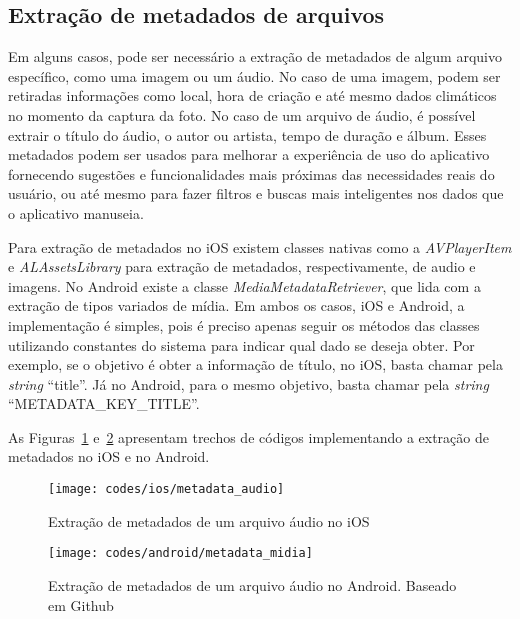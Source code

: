 \subsection{Extração de metadados de arquivos} \label{subsec:extracaometadata}
Em alguns casos, pode ser necessário a extração de metadados de algum arquivo específico, como uma imagem ou um áudio. No caso de uma imagem, podem ser retiradas informações como local, hora de criação e até mesmo 
dados climáticos no momento da captura da foto. No caso de um arquivo de áudio, é possível extrair o título do áudio, o autor ou artista, tempo de duração e álbum. Esses metadados podem ser usados para 
melhorar a experiência de uso do aplicativo fornecendo sugestões e funcionalidades mais próximas das necessidades reais do usuário, ou até mesmo para fazer filtros e buscas mais inteligentes nos dados que o 
aplicativo manuseia. 

Para extração de metadados no iOS existem classes nativas como a \textit{AVPlayerItem} e \textit{ALAssetsLibrary} para extração de metadados, respectivamente, de audio e imagens. No Android existe a 
classe \textit{MediaMetadataRetriever}, que lida com a extração de tipos variados de mídia. Em ambos os casos, iOS e Android, a implementação é simples, pois é preciso apenas seguir os métodos das classes 
utilizando constantes do sistema para indicar qual dado se deseja obter. Por exemplo, se o objetivo é obter a informação de título, no iOS, basta chamar pela \textit{string} ``title''. Já no Android, para o mesmo 
objetivo, basta chamar pela \textit{string} ``METADATA\_KEY\_TITLE''.

As Figuras~\ref{fig:metadata_audio-ios} e~\ref{fig:metadata_midia-android} apresentam trechos de códigos implementando a extração de metadados no iOS e no Android.

\begin{figure}[H]
	\centering
	\texttt{[image: codes/ios/metadata\_audio]}
	\caption[Extração de metadados de um arquivo áudio no iOS]{Extração de metadados de um arquivo áudio no iOS}
	\label{fig:metadata_audio-ios}
\end{figure}

\begin{figure}[H]
	\centering
	\texttt{[image: codes/android/metadata\_midia]}
	\caption[Extração de metadados de um arquivo áudio no Android]{Extração de metadados de um arquivo áudio no Android. Baseado em Github\protect\footnotemark}
	\label{fig:metadata_midia-android}
\end{figure}


